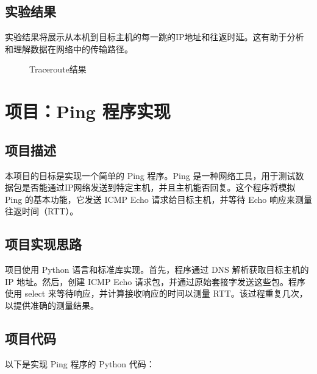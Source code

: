 \documentclass[UTF8,titlepage]{ctexart}
\numberwithin{figure}{section}
\begin{document}
\subsection{实验结果}
实验结果将展示从本机到目标主机的每一跳的IP地址和往返时延。这有助于分析和理解数据在网络中的传输路径。
\begin{figure}[H]
\centering
 \caption{Traceroute结果}
 \label{}
\end{figure}

\clearpage

\section{项目：Ping 程序实现}

\subsection{项目描述}
本项目的目标是实现一个简单的 Ping 程序。Ping 是一种网络工具，用于测试数据包是否能通过IP网络发送到特定主机，并且主机能否回复。这个程序将模拟 Ping 的基本功能，它发送 ICMP Echo 请求给目标主机，并等待 Echo 响应来测量往返时间（RTT）。

\subsection{项目实现思路}
项目使用 Python 语言和标准库实现。首先，程序通过 DNS 解析获取目标主机的 IP 地址。然后，创建 ICMP Echo 请求包，并通过原始套接字发送这些包。程序使用 select 来等待响应，并计算接收响应的时间以测量 RTT。该过程重复几次，以提供准确的测量结果。

\subsection{项目代码}
以下是实现 Ping 程序的 Python 代码：
\end{document}
